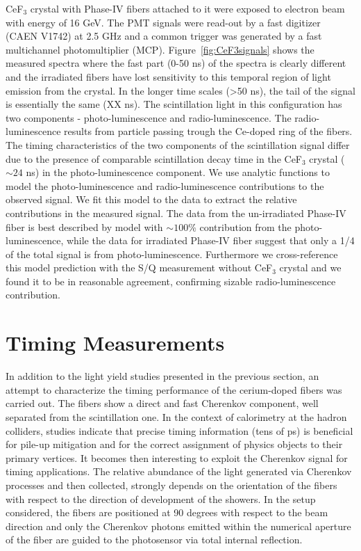 \documentclass[a4paper,11pt]{article}
\begin{document}
  CeF$_3$ crystal with Phase-IV fibers attached to it were exposed to electron beam with energy of 16 GeV. The PMT signals were read-out by a fast digitizer (CAEN V1742) at 2.5 GHz and a common trigger was generated by a fast multichannel photomultiplier (MCP). Figure~\ref{fig:CeF3signals} shows the measured spectra where the fast part (0-50 ns) of the spectra is clearly different and the irradiated fibers have lost sensitivity to this temporal region of light emission from the crystal.  In the longer time scales (>50 ns), the tail of the signal is essentially the same (XX ns). The scintillation light in this configuration has two components - photo-luminescence and radio-luminescence. The radio-luminescence results from particle passing trough the Ce-doped ring of the fibers. The timing characteristics of the two components of the scintillation signal differ due to the presence of comparable scintillation decay time in the CeF$_3$ crystal ($\sim 24$ ns) in the photo-luminescence component. We use analytic functions to model the photo-luminescence and radio-luminescence contributions to the observed signal. We fit this model to the data to extract the relative contributions in the measured signal. The data from the un-irradiated Phase-IV fiber is best described by model with $\sim 100$\% contribution from the photo-luminescence, while the data for irradiated Phase-IV fiber suggest that only a 1/4 of the total signal is from  photo-luminescence. Furthermore we cross-reference this model prediction with the S/Q measurement without CeF$_3$ crystal and we found it to be in reasonable agreement, confirming sizable radio-luminescence contribution. 

\section{Timing Measurements}
\label{sec:timing}
In addition to the light yield studies presented in the previous section, an attempt to characterize the timing performance of the cerium-doped fibers was carried out. The fibers show a direct and fast Cherenkov component, well separated from the scintillation one. In the context of calorimetry at the hadron colliders, studies indicate that precise timing information (tens of ps) is beneficial for pile-up mitigation and for the correct assignment of physics objects to their primary vertices. It becomes then interesting to exploit the Cherenkov signal for timing applications.  The relative abundance of the light generated via Cherenkov processes and then collected, strongly depends on the orientation of the fibers with respect to the direction of development of the showers. In the setup considered, the fibers are positioned at 90 degrees with respect to the beam direction and only the Cherenkov photons emitted within the numerical aperture of the fiber are guided to the photosensor via total internal reflection.
\end{document}
